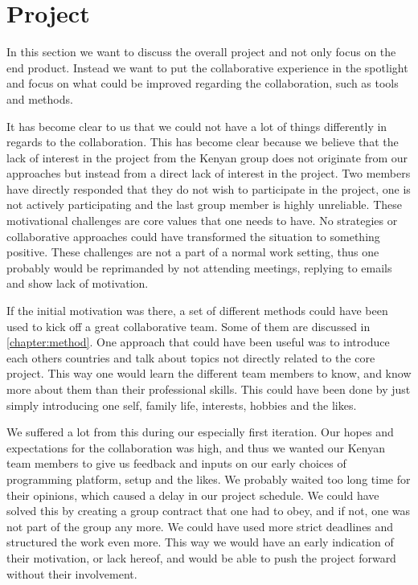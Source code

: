 \section{Project}\label{subsec:project}
In this section we want to discuss the overall project and not only focus on the end product. Instead we want to put the collaborative experience in the spotlight and focus on what could be improved regarding the collaboration, such as tools and methods. 

It has become clear to us that we could not have a lot of things differently in regards to the collaboration. This has become clear because we believe that the lack of interest in the project from the Kenyan group does not originate from our approaches but instead from a direct lack of interest in the project. Two members have directly responded that they do not wish to participate in the project, one is not actively participating and the last group member is highly unreliable. These motivational challenges are core values that one needs to have. No strategies or collaborative approaches could have transformed the situation to something positive. These challenges are not a part of a normal work setting, thus one probably would be reprimanded by not attending meetings, replying to emails and show lack of motivation.

If the initial motivation was there, a set of different methods could have been used to kick off a great collaborative team. Some of them are discussed in \ref{chapter:method}. One approach that could have been useful was to introduce each others countries and talk about topics not directly related to the core project. This way one would learn the different team members to know, and know more about them than their professional skills. This could have been done by just simply introducing one self, family life, interests, hobbies and the likes.

We suffered a lot from this during our especially first iteration. Our hopes and expectations for the collaboration was high, and thus we wanted our Kenyan team members to give us feedback and inputs on our early choices of programming platform, setup and the likes. We probably waited too long time for their opinions, which caused a delay in our project schedule. We could have solved this by creating a group contract that one had to obey, and if not, one was not part of the group any more. We could have used more strict deadlines and structured the work even more. This way we would have an early indication of their motivation, or lack hereof, and would be able to push the project forward without their involvement. 

